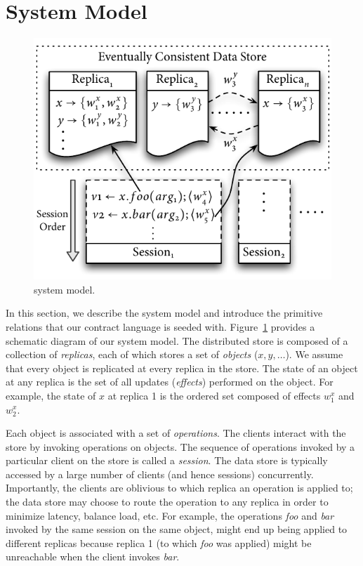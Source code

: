 \section{System Model}
\label{sec:sysmod}

\begin{figure}
\centering
\includegraphics[width=0.75\columnwidth]{Figures/SystemModel}
\caption{\name system model.}
\label{fig:sysmod}
\end{figure}

In this section, we describe the system model and introduce the primitive
relations that our contract language is seeded with. Figure~\ref{fig:sysmod}
provides a schematic diagram of our system model. The distributed store is
composed of a collection of \emph{replicas}, each of which stores a set of
\emph{objects} ($x,y,\ldots$). We assume that every object is replicated at
every replica in the store. The state of an object at any replica is the set of
all updates (\emph{effects}) performed on the object. For example, the state of
$x$ at replica 1 is the ordered set composed of effects $w^x_1$ and $w^x_2$.

Each object is associated with a set of \emph{operations}. The clients interact
with the store by invoking operations on objects. The sequence of operations
invoked by a particular client on the store is called a \emph{session}. The
data store is typically accessed by a large number of clients (and hence
sessions) concurrently. Importantly, the clients are oblivious to which replica
an operation is applied to; the data store may choose to route the operation to
any replica in order to minimize latency, balance load, etc. For example, the
operations \emph{foo} and \emph{bar} invoked by the same session on the same
object, might end up being applied to different replicas because replica 1 (to
which \emph{foo} was applied) might be unreachable when the client invokes
\emph{bar}.

